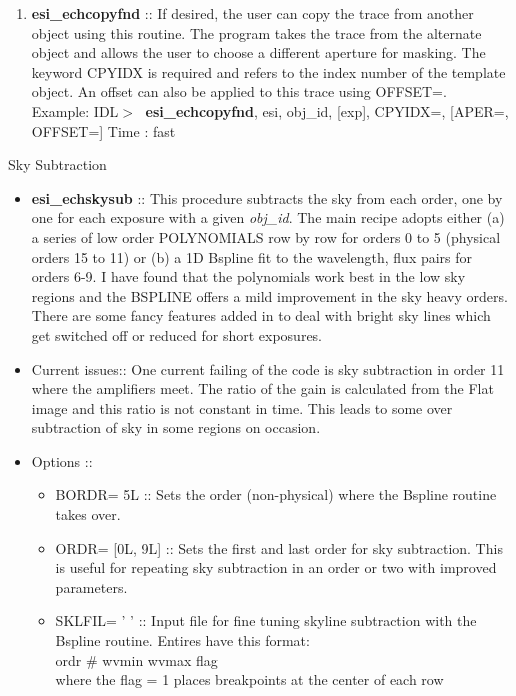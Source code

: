 \documentclass[11pt,letterpaper,dvips]{article}
\begin{document}
\begin{enumerate}
\begin{enumerate}
	\item {\bf esi\_echcopyfnd} :: If desired, the user can copy the
	trace from another object using this routine.   The program takes
	the trace from the alternate object and allows the user to choose
	a different aperture for masking. The keyword CPYIDX is required
	and refers to the index number of the template object.  An offset
	can also be applied to this trace using OFFSET=.  \\
         \quad Example: IDL$> \;$ {\bf esi\_echcopyfnd}, esi, obj\_id, [exp], 
		CPYIDX=, [APER=, OFFSET=]
         \quad Time   : fast 
  \end{enumerate}

{\Large  \item Sky Subtraction}
  \begin{itemize}
	\item {\bf esi\_echskysub} ::
	This procedure subtracts the sky from each order, one by one for
	each exposure with a given {\it obj\_id}.  The main recipe adopts either
	(a) a series of low order POLYNOMIALS row by row for orders 0 to 5
	(physical orders 15 to 11) or (b) a 1D 
	Bspline fit to the wavelength, flux pairs for orders 6-9. 
	I have found that the polynomials work best in the low sky regions and
	the BSPLINE offers a mild improvement in the sky heavy orders.
	There are some fancy features added in to deal with
	bright sky lines which get switched off or reduced for short exposures.
	\item Current issues::  One current failing of the code is sky subtraction
	in order 11 where the amplifiers meet.  The ratio of the gain is calculated
	from the Flat image and this ratio is not constant in time.  This leads
	to some over subtraction of sky in some regions on occasion.	
	\item Options ::
	\begin{itemize}
	  \item BORDR= 5L ::  Sets the order (non-physical) where the Bspline 
		routine takes over.
	  \item ORDR= [0L, 9L] ::  Sets the first and last order for sky subtraction.
		This is useful for repeating sky subtraction in an order or two
		with improved parameters.
	  \item SKLFIL= ' ' ::  Input file for fine tuning skyline subtraction with
		the Bspline routine.  Entires have this format: \\
		\quad ordr \# wvmin wvmax flag \\
		where the flag = 1 places breakpoints at the center of each row

\end{itemize}
\end{itemize}
\end{enumerate}
\end{document}
